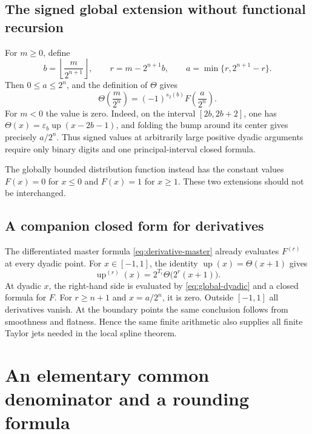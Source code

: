 \documentclass[11pt,a4paper]{article}
\numberwithin{equation}{section}
\theoremstyle{definition}
\theoremstyle{remark}
\newcommand{\up}{\operatorname{up}}
\newcommand{\eps}{\varepsilon}
\newcommand{\floor}[1]{\left\lfloor #1\right\rfloor}
\newcommand{\bits}{s_2}
\begin{document}
\subsection{The signed global extension without functional recursion}
For $m\ge0$, define
\begin{equation}
 b=\floor{\frac{m}{2^{n+1}}},\qquad
 r=m-2^{n+1}b,\qquad
 a=\min\{r,2^{n+1}-r\}.
 \label{eq:global-fold-data}
\end{equation}
Then $0\le a\le2^n$, and the definition of $\Theta$ gives
\begin{equation}
 \boxed{\displaystyle
 \Theta\!\left(\frac m{2^n}\right)
 =(-1)^{\bits(b)}F\!\left(\frac a{2^n}\right).}
 \label{eq:global-dyadic}
\end{equation}
For $m<0$ the value is zero. Indeed, on the interval $[2b,2b+2]$, one has
$\Theta(x)=\eps_b\up(x-2b-1)$, and folding the bump around its center gives precisely $a/2^n$. Thus signed values at arbitrarily large positive dyadic arguments require only binary digits and one principal-interval closed formula.

The globally bounded distribution function instead has the constant values $F(x)=0$ for $x\le0$ and $F(x)=1$ for $x\ge1$. These two extensions should not be interchanged.

\subsection{A companion closed form for derivatives}
The differentiated master formula \cref{eq:derivative-master} already evaluates $F^{(r)}$ at every dyadic point. For $x\in[-1,1]$, the identity $\up(x)=\Theta(x+1)$ gives
\begin{equation}
 \up^{(r)}(x)=2^{T_r}\Theta\bigl(2^r(x+1)\bigr).
 \label{eq:up-derivatives}
\end{equation}
At dyadic $x$, the right-hand side is evaluated by \cref{eq:global-dyadic} and a closed formula for $F$. For $r\ge n+1$ and $x=a/2^n$, it is zero. Outside $[-1,1]$ all derivatives vanish. At the boundary points the same conclusion follows from smoothness and flatness. Hence the same finite arithmetic also supplies all finite Taylor jets needed in the local spline theorem.

\section{An elementary common denominator and a rounding formula}
\label{sec:denominator}
\end{document}
